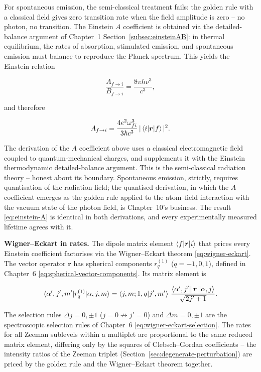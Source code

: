 For spontaneous emission, the semi-classical treatment fails: the golden rule with a classical field gives zero transition rate when the field amplitude is zero -- no photon, no transition. The Einstein $A$ coefficient is obtained via the detailed-balance argument of Chapter~1 Section~\ref{subsec:einsteinAB}: in thermal equilibrium, the rates of absorption, stimulated emission, and spontaneous emission must balance to reproduce the Planck spectrum. This yields the Einstein relation
\begin{linenomath}
\begin{equation*}
\frac{A_{f\to i}}{B_{f\to i}} = \frac{8\pi h\nu^{3}}{c^{3}},
\end{equation*}
\end{linenomath}
and therefore
\begin{linenomath}
\begin{equation}
A_{f\to i} = \frac{4e^{2}\omega_{fi}^{3}}{3\hbar c^{3}}\,|\braket{i|\bm r|f}|^{2}.
\label{eq:einstein-A}
\end{equation}
\end{linenomath}

\begin{note}
The derivation of the $A$ coefficient above uses a classical electromagnetic field coupled to quantum-mechanical charges, and supplements it with the Einstein thermodynamic detailed-balance argument. This is the semi-classical radiation theory -- honest about its boundary. Spontaneous emission, strictly, requires quantisation of the radiation field; the quantised derivation, in which the $A$ coefficient emerges as the golden rule applied to the atom--field interaction with the vacuum state of the photon field, is Chapter~10's business. The result \eqref{eq:einstein-A} is identical in both derivations, and every experimentally measured lifetime agrees with it.
\end{note}

\medskip\noindent\textbf{Wigner--Eckart in rates.}
The dipole matrix element $\braket{f|\bm r|i}$ that prices every Einstein coefficient factorises via the Wigner--Eckart theorem \eqref{eq:wigner-eckart}. The vector operator $\bm r$ has spherical components $r^{(1)}_{q}$ ($q = -1,0,1$), defined in Chapter~6 \eqref{eq:spherical-vector-components}. Its matrix element is
\begin{linenomath}
\begin{equation*}
\braket{\alpha',j',m'|r^{(1)}_{q}|\alpha,j,m}
= \braket{j,m;1,q|j',m'}\,\frac{\braket{\alpha',j'||\bm r||\alpha,j}}{\sqrt{2j'+1}}.
\end{equation*}
\end{linenomath}
The selection rules $\Delta j = 0,\pm1$ ($j=0 \not\to j'=0$) and $\Delta m = 0,\pm1$ are the spectroscopic selection rules of Chapter~6 \eqref{eq:wigner-eckart-selection}. The rates for all Zeeman sublevels within a multiplet are proportional to the same reduced matrix element, differing only by the squares of Clebsch--Gordan coefficients -- the intensity ratios of the Zeeman triplet (Section~\ref{sec:degenerate-perturbation}) are priced by the golden rule and the Wigner--Eckart theorem together.

